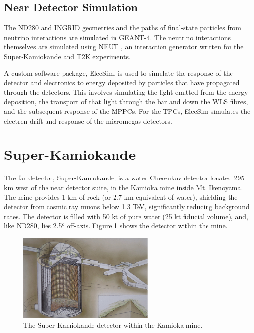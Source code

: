 \subsection{Near Detector Simulation}\label{sec:ndsim}

The ND280 and INGRID geometries and the paths of final-state particles from neutrino interactions are simulated in GEANT-4. The neutrino interactions themselves are simulated using NEUT \cite{neut}, an interaction generator written for the Super-Kamiokande and T2K experiments.

A custom software package, ElecSim, is used to simulate the response of the detector and electronics to energy deposited by particles that have propagated through the detectors. This involves simulating the light emitted from the energy deposition, the transport of that light through the bar and down the WLS fibres, and the subsequent response of the MPPCs. For the TPCs, ElecSim simulates the electron drift and response of the micromegas detectors. 

\section{Super-Kamiokande}\label{sec:SK}

The far detector, Super-Kamiokande, is a water Cherenkov detector located 295 km west of the near detector suite, in the Kamioka mine inside Mt. Ikenoyama. The mine provides 1 km of rock (or 2.7 km equivalent of water), shielding the detector from cosmic ray muons below 1.3 TeV, significantly reducing background rates. The detector is filled with 50 kt of pure water (25 kt fiducial volume), and, like ND280, lies 2.5$^o$ off-axis. Figure \ref{fig:superk} shows the detector within the mine.

\begin{figure}[!htbp]
\centering
\includegraphics*[width=0.6\textwidth,clip]{figs/Superk}
\caption{The Super-Kamiokande detector within the Kamioka mine.}\label{fig:superk}
\end{figure}

